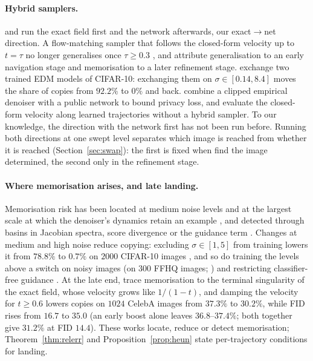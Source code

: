 \documentclass{article} %
\theoremstyle{plain}
\theoremstyle{definition}
\theoremstyle{remark}
\begin{document}
\paragraph{Hybrid samplers.} \citet{bertrand2025closed} and \citet{liu2025navigation} run the exact
field first and the network afterwards, our exact$\to$net direction. A flow-matching sampler that
follows the closed-form velocity up to $t=\tau$ no longer generalises once $\tau\ge0.3$
\citep{bertrand2025closed}, and \citet{liu2025navigation} attribute generalisation to an early
navigation stage and memorisation to a later refinement stage. \citet{dodson2026calm} exchange two
trained EDM models of CIFAR-10: exchanging them on $\sigma\in[0.14,8.4]$ moves the share of copies
from $92.2\%$ to $0\%$ and back. \citet{cheng2026privacy} combine a clipped empirical denoiser with a
public network to bound privacy loss, and \citet{briq2026tracing} evaluate the closed-form velocity
along learned trajectories without a hybrid sampler. To our knowledge, the direction with the
network first has not been run before. Running both directions at one swept level separates which
image is reached from whether it is reached (Section~\ref{sec:swap}): the first is fixed when
\citet{bertrand2025closed} find the image determined, the second only in the refinement stage.

\paragraph{Where memorisation arises, and late landing.} Memorisation risk has been located at medium
noise levels \citep{dodson2026calm,kaiser2026structural} and at the largest scale at which the
denoiser's dynamics retain an example \citep{lopezamado2026modes}, and detected through basins in
Jacobian spectra, score divergence or the guidance term
\citep{jaziri2026spectral,verma2026early,wen2024detecting,pham2025memorization}. Changes at medium
and high noise reduce copying: excluding $\sigma\in[1,5]$ from training lowers it from $78.8\%$ to
$0.7\%$ on $2000$ CIFAR-10 images \citep{dodson2026calm}, and so do training the levels above a
switch on noisy images (on $300$ FFHQ images; \citealp{shah2025ambient}) and restricting classifier-free guidance
\citep{kim2025how,jain2025attraction}. At the late end, \citet{li2026kinetic} trace memorisation to
the terminal singularity of the exact field, whose velocity grows like $1/(1-t)$, and damping the
velocity for $t\ge0.6$ lowers copies on $1024$ CelebA images from $37.3\%$ to $30.2\%$, while FID rises
from $16.7$ to $35.0$ (an early boost alone leaves $36.8$--$37.4\%$; both together give $31.2\%$ at FID
$14.4$). These works locate, reduce or detect memorisation; Theorem~\ref{thm:relerr} and
Proposition~\ref{prop:heun} state per-trajectory conditions for landing.
\end{document}
